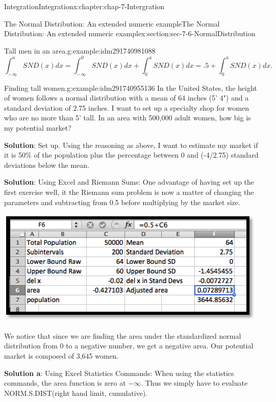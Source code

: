 \documentclass[oneside,10pt,]{book}
\newcommand{\terminology}[1]{\textbf{#1}}
\numberwithin{equation}{section}
\begin{document}
\begin{chapterptx}{Integration}{}{Integration}{}{}{x:chapter:chap-7-Intergration}
\begin{sectionptx}{The Normal Distribution: An extended numeric example}{}{The Normal Distribution: An extended numeric example}{}{}{x:section:sec-7-6-NormalDistribution}
\begin{example}{Tall men in an area.}{g:example:idm291740981088}
\begin{equation*}
\int_{-\infty}^a SND(x)dx=\int_{-\infty}^0 SND(x)dx+\int_0^a SND(x)dx=.5+\int_0^a SND(x)dx.
\end{equation*}
\end{example}
\begin{example}{Finding tall women.}{g:example:idm291740955136}%
In the United States, the height of women follows a normal distribution with a mean of 64 inches (5' 4") and a standard deviation of 2.75 inches.  I want to set up a specialty shop for women who are no more than 5' tall.  In an area with 500,000 adult women, how big is my potential market?%
\par
\terminology{Solution}: Set up.  Using the reasoning as above, I want to estimate my market if it is 50\% of the population plus the percentage between 0 and (-4\slash{}2.75) standard deviations below the mean.%
\par
\terminology{Solution}: Using Excel and Riemann Sums:  One advantage of having set up the first exercise well, it the Riemann sum problem is now a matter of changing the parameters and subtracting from 0.5 before multiplying by the market size.%
\begin{sidebyside}{1}{0.25}{0.25}{0}%
\begin{sbspanel}{0.5}%
\includegraphics[width=\linewidth]{images/sec7-6-7.png}
\end{sbspanel}%
\end{sidebyside}%
\par
We notice that since we are finding the area under the standardized normal distribution from 0 to a negative number, we get a negative area.  Our potential market is composed of 3,645 women.%
\par
\terminology{Solution a}: Using Excel Statistics Commands:  When using the statistics commands, the area function is zero at \(-\infty\).  Thus we simply have to evaluate%
 NORM.S.DIST(right hand limit, cumulative). \begin{sidebyside}{1}{0.2}{0.2}{0}%
\begin{sbspanel}{0.6}%

\end{sbspanel}
\end{sidebyside}
\end{example}
\end{sectionptx}
\end{chapterptx}
\end{document}
